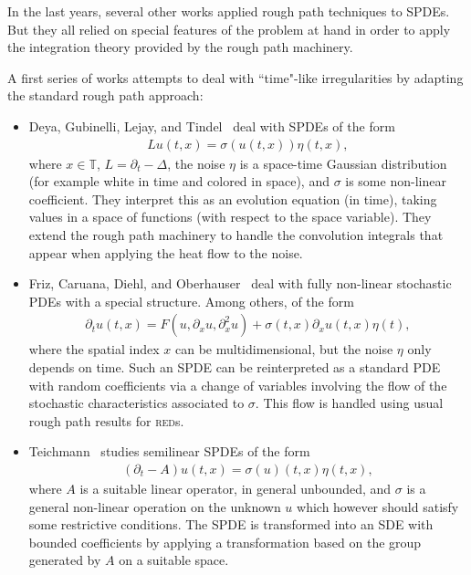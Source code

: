 \documentclass[11pt,a4paper]{article}
\newcommand{\mathd}{\mathrm{d}}
\theoremstyle{remark}
\begin{document}

In the last years, several other works applied rough path techniques to SPDEs. 
But they all relied on special features of the problem at hand in order to apply the integration theory provided by the rough path machinery. 

A first series of works attempts to deal with ``time"-like irregularities by adapting the standard rough path approach:

\begin{itemize}
\item[--]
Deya, Gubinelli, Lejay, and Tindel~\cite{Gubinelli2006,Gubinelli2012a,Deya2012} deal with SPDEs of the form
\begin{align*}
   L u (t, x) = \sigma ( u ( t, x ) ) \eta ( t,x),
\end{align*}
where $x \in \mathbb{T}$, $L = \partial_t - \Delta$, the noise $\eta$ is a space-time Gaussian distribution (for example white in time and colored in space), and $\sigma$ is some non-linear coefficient. They interpret this as an evolution equation (in time), taking values in a space of functions (with respect to the space variable). They extend the rough path machinery to handle the convolution integrals that appear when applying the heat flow to the noise.

\item[--]
Friz, Caruana, Diehl, and Oberhauser~\cite{Caruana2009,Caruana2011,Friz2011b,Diehl2012} deal with fully non-linear stochastic PDEs with a special structure. Among others, of the form
\begin{align*}
   \partial_t u ( t, x ) = F ( u, \partial_{x} u, \partial_{x}^2 u) + \sigma( t, x) \partial_{x} u( t, x) \eta(t),
\end{align*}
where the spatial index $x$ can be multidimensional, but the noise $\eta$ only depends on time. Such an SPDE can be reinterpreted as a standard PDE with random coefficients via a change of variables involving the flow of the stochastic characteristics associated to $\sigma$. This flow is handled using usual rough path results for \textsc{red}s.

\item[--]
Teichmann~\cite{Teichmann2011} studies semilinear SPDEs of the form
\begin{align*}
   (\partial_t - A) u(t,x) = \sigma(u)(t,x) \eta(t,x),
\end{align*}
where $A$ is a suitable linear operator, in general unbounded, and $\sigma$ is a general non-linear operation on the unknown $u$ which however should satisfy some restrictive conditions. The SPDE is transformed into an SDE with bounded coefficients by applying a  transformation based on the group generated by $A$ on a suitable space.
\end{itemize}
\end{document}
